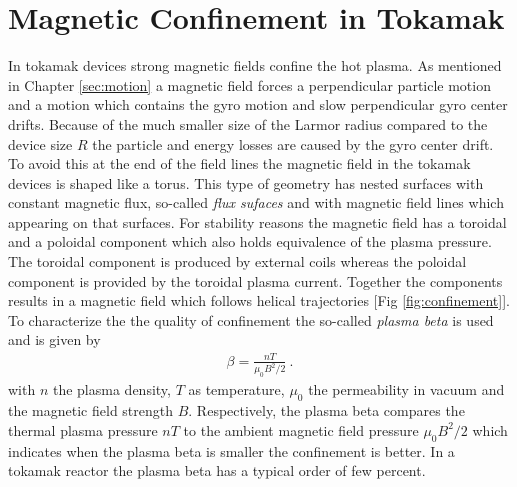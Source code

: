 \newpage
\section{Magnetic Confinement in Tokamak}
\label{sec:confinement}

In tokamak devices strong magnetic fields confine the hot plasma. As mentioned in Chapter \ref{sec:motion} a magnetic field forces a perpendicular particle motion and a motion which contains the gyro motion and slow perpendicular gyro center drifts. Because of the much smaller size of the Larmor radius compared to the device size $R$ the particle and energy losses are caused by the gyro center drift. To avoid this at the end of the field lines the magnetic field in the tokamak devices is shaped like a torus. This type of geometry has nested surfaces with constant magnetic flux, so-called \textit{flux sufaces} and with magnetic field lines which appearing on that surfaces. For stability reasons the magnetic field has a toroidal and a poloidal component which also holds equivalence of the plasma pressure. \cite{Stroth2011, Wesson2011} The toroidal component is produced by external coils whereas the poloidal component is provided by the toroidal plasma current. Together the components results in a magnetic field which follows helical trajectories [Fig \ref{fig:confinement}]. To characterize the the quality of confinement the so-called \textit{plasma beta} is used and is given by
\begin{gather}
    \beta = \frac{nT}{\mu_0 B^2/2}~.
\end{gather} 
with $n$ the plasma density, $T$ as temperature, $\mu_0$ the permeability in vacuum and the magnetic field strength $B$. Respectively, the plasma beta compares the thermal plasma pressure $nT$ to the ambient magnetic field pressure $\mu_0 B^2/2$ which indicates when the plasma beta is smaller the confinement is better. In a tokamak reactor the plasma beta has a typical order of few percent. \cite{Wesson2011}
